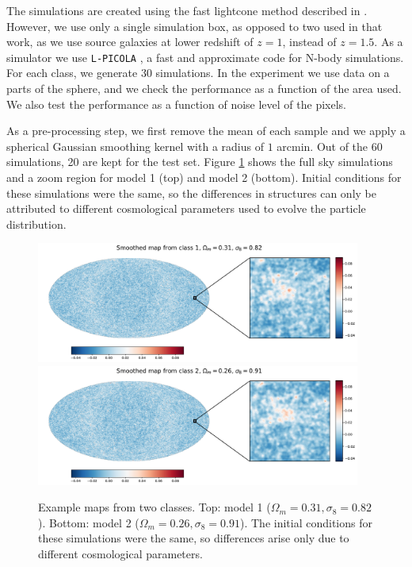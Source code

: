 \documentclass[final,twocolumn,3p,times,authoryear]{elsarticle}
\newcommand{\1}{\b{1}}              %
\newcommand{\0}{\b{0}}              %
\newcommand{\pkg}[1]{\texttt{#1}}
\begin{document}
The simulations are created using the fast lightcone method described in \citep{sgier2018fastgeneration}.
However, we use only a single simulation box, as opposed to two used in that work, as we use source galaxies at lower redshift of $z=1$, instead of $z=1.5$.
As a simulator we use \pkg{L-PICOLA} \citep{howlett2015lpicola}, a fast and approximate code for N-body simulations.
For each class, we generate 30 simulations.
In the experiment we use data on a parts of the sphere, and we check the performance as a function of the area used.
We also test the performance as a function of noise level of the pixels.

As a pre-processing step, we first remove the mean of each sample and we apply a spherical Gaussian smoothing kernel with a radius of $1$ arcmin.
Out of the 60 simulations, 20 are kept for the test set.
Figure \ref{fig:map_sample} shows the full sky simulations and a zoom region for model 1 (top) and model 2 (bottom).
Initial conditions for these simulations were the same, so the differences in structures can only be attributed to different cosmological parameters used to evolve the particle distribution.

\begin{figure}[!ht]
\centering
\includegraphics[width=0.95\textwidth]{figures/smooth_map_class_1.pdf}
\includegraphics[width=0.95\textwidth]{figures/smooth_map_class_2.pdf}
\caption{Example maps from two classes. Top: model 1 ($\Omega_m=0.31, \sigma_8=0.82$). Bottom: model 2 ($\Omega_m=0.26, \sigma_8=0.91$).
The initial conditions for these simulations were the same, so differences arise only due to different cosmological parameters.}
\label{fig:map_sample}
\end{figure}
\end{document}
